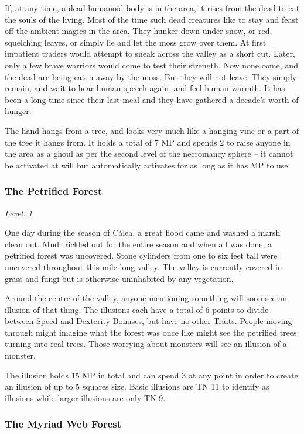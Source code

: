 \begin{multicols}{2}
If, at any time, a dead humanoid body is in the area, it rises from the dead to eat the souls of the living.  Most of the time such dead creatures like to stay and feast off the ambient magics in the area.  They hunker down under snow, or red, squelching leaves, or simply lie and let the moss grow over them.   At first impatient traders would attempt to sneak across the valley as a short cut.  Later, only a few brave warriors would come to test their strength.  Now none come, and the dead are being eaten away by the moss.  But they will not leave.  They simply remain, and wait to hear human speech again, and feel human warmth.  It has been a long time since their last meal and they have gathered a decade's worth of hunger.

The hand hangs from a tree, and looks very much like a hanging vine or a part of the tree it hangs from.  It holds a total of 7 MP and spends 2 to raise anyone in the area as a ghoul as per the second level of the necromancy sphere -- it cannot be activated at will but automatically activates for as long as it has MP to use.

\subsubsection{The Petrified Forest}

\textit{Level: 1}

One day during the season of C\'{a}lea, a great flood came and washed a marsh clean out.  Mud trickled out for the entire season and when all was done, a petrified forest was uncovered.  Stone cylinders from one to six feet tall were uncovered throughout this mile long valley.  The valley is currently covered in grass and fungi but is otherwise uninhabited by any vegetation.

Around the centre of the valley, anyone mentioning something will soon see an illusion of that thing.  The illusions each have a total of 6 points to divide between Speed and Dexterity Bonuses, but have no other Traits.  People moving through might imagine what the forest was once like might see the petrified trees turning into real trees.  Those worrying about monsters will see an illusion of a monster.

The illusion holds 15 MP in total and can spend 3 at any point in order to create an illusion of up to 5 squares size.  Basic illusions are TN 11 to identify as illusions while larger illusions are only TN 9.

\subsubsection{The Myriad Web Forest}


\end{multicols}
